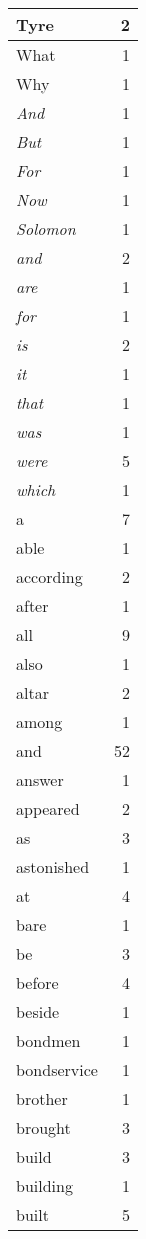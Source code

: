 \begin{center}
\begin{longtable}{l|r}
Tyre & 2 \\ \hline
What & 1 \\ \hline
Why & 1 \\ \hline
\emph{And} & 1 \\ \hline
\emph{But} & 1 \\ \hline
\emph{For} & 1 \\ \hline
\emph{Now} & 1 \\ \hline
\emph{Solomon} & 1 \\ \hline
\emph{and} & 2 \\ \hline
\emph{are} & 1 \\ \hline
\emph{for} & 1 \\ \hline
\emph{is} & 2 \\ \hline
\emph{it} & 1 \\ \hline
\emph{that} & 1 \\ \hline
\emph{was} & 1 \\ \hline
\emph{were} & 5 \\ \hline
\emph{which} & 1 \\ \hline
a & 7 \\ \hline
able & 1 \\ \hline
according & 2 \\ \hline
after & 1 \\ \hline
all & 9 \\ \hline
also & 1 \\ \hline
altar & 2 \\ \hline
among & 1 \\ \hline
and & 52 \\ \hline
answer & 1 \\ \hline
appeared & 2 \\ \hline
as & 3 \\ \hline
astonished & 1 \\ \hline
at & 4 \\ \hline
bare & 1 \\ \hline
be & 3 \\ \hline
before & 4 \\ \hline
beside & 1 \\ \hline
bondmen & 1 \\ \hline
bondservice & 1 \\ \hline
brother & 1 \\ \hline
brought & 3 \\ \hline
build & 3 \\ \hline
building & 1 \\ \hline
built & 5 \\ \hline

\end{longtable}
\end{center}
